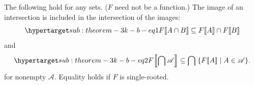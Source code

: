 \documentclass{report}
\begin{document}
\subsection{}%

\begin{theorem}[3K(b)]

  The following hold for any sets. ($F$ need not be a function.)
  The image of an intersection is included in the intersection of the images:
    \begin{equation}
      \hyperlabel{sub:theorem-3k-b-eq1}
      \img{F}{A \cap B} \subseteq \img{F}{A} \cap \img{F}{B}
    \end{equation}
    and
    \begin{equation}
      \hyperlabel{sub:theorem-3k-b-eq2}
      \img{F}{\bigcap\mathscr{A}} \subseteq
        \bigcap\;\{\img{F}{A} \mid A \in \mathscr{A}\}.
    \end{equation}
    for nonempty $\mathscr{A}$.
  Equality holds if $F$ is single-rooted.

\end{theorem}
\end{document}
